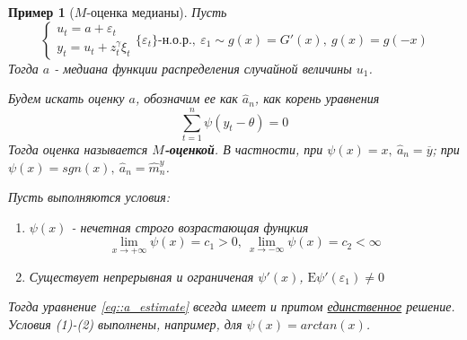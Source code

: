 \documentclass[12pt]{article}
\newtheorem*{example}{Пример}
\theoremstyle{basic_theorem}
\theoremstyle{name_theorem}
\newcommand\defin[1]{\textbf{#1}}
\def\eps{ \varepsilon }
\def\E{ \mathrm{E} }
\begin{document}
\begin{example}[$M$-оценка медианы]
    Пусть 
    \[\begin{cases}
        u_t=a+\eps_t \\ y_t=u_t+z_t^\gamma\xi_t
    \end{cases} \{\eps_t\}\text{-н.о.р.},\ \eps_1\sim g(x)=G'(x),\ g(x)=g(-x)\]
     Тогда $a$ - медиана функции распределения случайной величины $u_1$.

     Будем искать оценку $a$, обозначим ее как $\widehat{a}_n$, как корень уравнения
     \begin{equation}\label{eq::a_estimate}
         \sum_{t=1}^n\psi(y_t-\theta)=0
     \end{equation}
     Тогда оценка называется \defin{$M$-оценкой}. В частности, при $\psi(x)=x,\ \widehat{a}_n=\overline{y}$;
     при $\psi(x)=sgn(x),\ \widehat{a}_n=\widehat{m}_n^y$.

     Пусть выполняются условия: \begin{enumerate}
         \item $\psi(x)$ - нечетная строго возрастающая фунцкия
         \[\lim_{x\rightarrow+\infty}\psi(x)=c_1>0,\ \lim_{x\rightarrow-\infty}\psi(x)=c_2<\infty\]
         \item Существует непрерывная и ограниченая $\psi'(x)$, $\E\psi'(\eps_1)\neq0$
     \end{enumerate}
     Тогда уравнение \eqref{eq::a_estimate} всегда имеет и притом \underline{единственное} решение.
     Условия (1)-(2) выполнены, например, для $\psi(x)=arctan(x)$.


\end{example}
\end{document}
